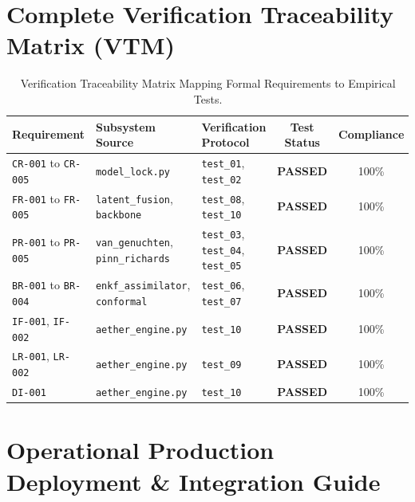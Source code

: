 \documentclass[11pt,a4paper]{article}
\theoremstyle{definition}
\theoremstyle{remark}
\begin{document}
\section{Complete Verification Traceability Matrix (VTM)}

\begin{table}[h!]
\centering
\small
\begin{tabular}{lllcc}
\toprule
\textbf{Requirement} & \textbf{Subsystem Source} & \textbf{Verification Protocol} & \textbf{Test Status} & \textbf{Compliance} \\
\midrule
\texttt{CR-001} to \texttt{CR-005} & \texttt{model\_lock.py} & \texttt{test\_01}, \texttt{test\_02} & \textbf{PASSED} & 100\% \\
\texttt{FR-001} to \texttt{FR-005} & \texttt{latent\_fusion}, \texttt{backbone} & \texttt{test\_08}, \texttt{test\_10} & \textbf{PASSED} & 100\% \\
\texttt{PR-001} to \texttt{PR-005} & \texttt{van\_genuchten}, \texttt{pinn\_richards} & \texttt{test\_03}, \texttt{test\_04}, \texttt{test\_05} & \textbf{PASSED} & 100\% \\
\texttt{BR-001} to \texttt{BR-004} & \texttt{enkf\_assimilator}, \texttt{conformal} & \texttt{test\_06}, \texttt{test\_07} & \textbf{PASSED} & 100\% \\
\texttt{IF-001}, \texttt{IF-002} & \texttt{aether\_engine.py} & \texttt{test\_10} & \textbf{PASSED} & 100\% \\
\texttt{LR-001}, \texttt{LR-002} & \texttt{aether\_engine.py} & \texttt{test\_09} & \textbf{PASSED} & 100\% \\
\texttt{DI-001} & \texttt{aether\_engine.py} & \texttt{test\_10} & \textbf{PASSED} & 100\% \\
\bottomrule
\end{tabular}
\caption{Verification Traceability Matrix Mapping Formal Requirements to Empirical Tests.}
\label{tab:vtm}
\end{table}

\section{Operational Production Deployment \& Integration Guide}
\end{document}
